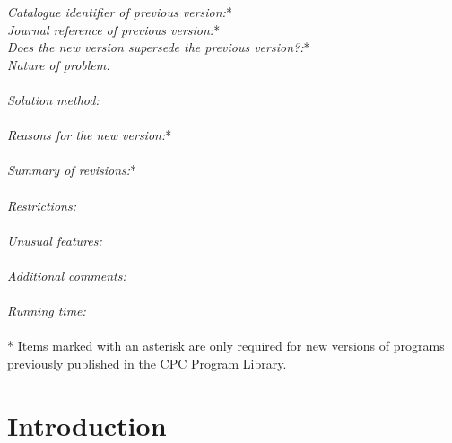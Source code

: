 \documentclass[preprint,12pt]{elsarticle}
\begin{document}
\begin{small}
{\em Catalogue identifier of previous version:}*              \\
{\em Journal reference of previous version:}*                  \\
{\em Does the new version supersede the previous version?:}*   \\
{\em Nature of problem:}\\
   \\
{\em Solution method:}\\
   \\
{\em Reasons for the new version:}*\\
   \\
{\em Summary of revisions:}*\\
   \\
{\em Restrictions:}\\
   \\
{\em Unusual features:}\\
   \\
{\em Additional comments:}\\
   \\
{\em Running time:}\\
   \\
* Items marked with an asterisk are only required for new versions
of programs previously published in the CPC Program Library.\\
\end{small}

\clearpage

\tableofcontents

\section{Introduction}\label{sec:intro}
\end{document}
